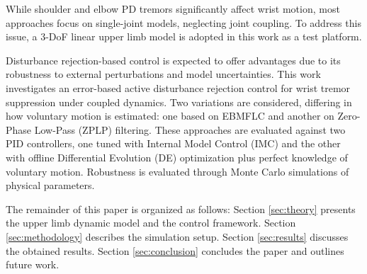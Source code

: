 {While shoulder and elbow PD tremors significantly affect wrist motion,
most approaches focus on single-joint models, neglecting joint coupling. 
To address this issue, a 3-DoF linear upper limb model 
\citep{Gebai:2017, Gebai:2018} 
is adopted in this work as a test platform.

Disturbance rejection-based control 
\citep{Guo:2016}
is expected to offer advantages due to its robustness to external perturbations and model uncertainties. 
This work investigates an error-based active disturbance rejection control for wrist tremor suppression under coupled dynamics. Two variations are considered, differing in how voluntary motion is estimated: one based on EBMFLC \cite{Qi:2024} and another on Zero-Phase Low-Pass (ZPLP) filtering. 
These approaches are evaluated against two PID controllers, one tuned with Internal Model Control (IMC) and the other with offline Differential Evolution (DE) optimization plus perfect knowledge of voluntary motion. 
Robustness is evaluated through Monte Carlo simulations of physical parameters.
}

The remainder of this paper is organized as follows: Section \ref{sec:theory} presents the upper limb dynamic model and the control framework. Section \ref{sec:methodology} describes the simulation setup. Section \ref{sec:results} discusses the obtained results. Section \ref{sec:conclusion} concludes the paper and outlines future work.
